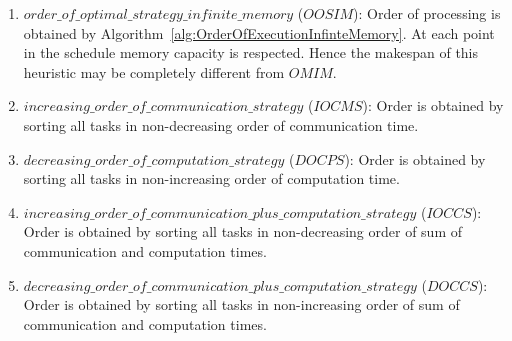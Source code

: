 \documentclass[sigconf]{acmart}
\begin{document}
	
	\begin{enumerate}[label=\roman*)]
		\item $order  \_ \allowbreak  \allowbreak of  \_ \allowbreak  \allowbreak optimal \_ \allowbreak strategy \_ \allowbreak infinite \_ \allowbreak memory $ ($OOSIM$): Order of processing is obtained by Algorithm~\ref{alg:OrderOfExecutionInfinteMemory}. At each point in the schedule memory capacity is respected. Hence the makespan of this heuristic may be completely different from $OMIM$.
		
		\item $increasing \_ \allowbreak order \_ \allowbreak of \_ \allowbreak communication \_ \allowbreak strategy$ ($IOCMS$): Order is obtained by sorting all tasks in non-decreasing order of communication time. 
		
		\item $decreasing \_ \allowbreak order \_ \allowbreak of \_ \allowbreak computation \_ \allowbreak strategy$ ($DOCPS$): Order is obtained by sorting all tasks in non-increasing order of computation time. 
		\item $increasing \_ \allowbreak order \_ \allowbreak of \_ \allowbreak communication \_ \allowbreak plus \_ \allowbreak computation \_ \allowbreak strategy$ ($IOCCS$): Order is obtained by sorting all tasks in non-decreasing order of sum of communication and computation times.
		\item $decreasing \_ \allowbreak order \_ \allowbreak of \_ \allowbreak communication \_ \allowbreak plus \_ \allowbreak computation \_ \allowbreak strategy$ ($DOCCS$): Order is obtained by sorting all tasks in non-increasing order of sum of communication and computation times.
		
	\end{enumerate}
\end{document}
